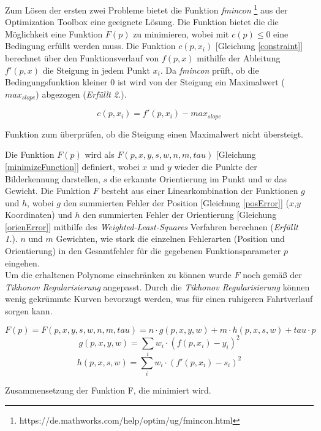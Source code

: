 Zum Lösen der ersten zwei Probleme bietet die \matlab Funktion \textit{fmincon} \footnote{https://de.mathworks.com/help/optim/ug/fmincon.html} aus der Optimization Toolbox eine geeignete Lösung. Die Funktion bietet die die Möglichkeit eine Funktion $F(p)$ zu minimieren, wobei mit $c(p) \leq 0$ eine Bedingung erfüllt werden muss. Die Funktion $c(p,x_i)$ [Gleichung \ref{constraint}] berechnet über den Funktionsverlauf von $f(p,x)$ mithilfe der Ableitung $f'(p,x)$ die Steigung in jedem Punkt $x_i$. Da \textit{fmincon} prüft, ob die Bedingungsfunktion kleiner 0 ist wird von der Steigung ein Maximalwert ($max_{slope}$) abgezogen (\textit{Erfüllt 2.}).\\
\begin{ownequation}[H]
\begin{equation}
c(p,x_i) = f'(p,x_i)-max_{slope}
\end{equation}
\caption{Funktion zum überprüfen, ob die Steigung einen Maximalwert nicht übersteigt.}
\label{constraint}
\end{ownequation}
Die Funktion $F(p)$ wird als $F(p,x,y,s,w,n,m,tau)$ [Gleichung \ref{minimizeFunction}] definiert, wobei $x$ und $y$ wieder die Punkte der Bilderkennung darstellen, $s$ die erkannte Orientierung im Punkt und $w$ das Gewicht. Die Funktion $F$ besteht aus einer Linearkombination der Funktionen $g$ und $h$, wobei $g$ den summierten Fehler der Position [Gleichung \ref{posError}] ($x$,$y$ Koordinaten) und $h$ den summierten Fehler der Orientierung [Gleichung \ref{orienError}] mithilfe des \textit{Weighted-Least-Squares} Verfahren berechnen (\textit{Erfüllt 1.}). $n$ und $m$ Gewichten, wie stark die einzelnen Fehlerarten (Position und Orientierung) in den Gesamtfehler für die gegebenen Funktionsparameter $p$ eingehen.\\
Um die erhaltenen Polynome einschränken zu können wurde $F$ noch gemäß der \textit{Tikhonov Regularisierung} \cite{kaipio2006statistical} angepasst. Durch die \textit{Tikhonov Regularisierung} können wenig gekrümmte Kurven bevorzugt werden, was für einen ruhigeren Fahrtverlauf sorgen kann.
\begin{ownequation}[H]
\begin{equation}
\label{minimizeFunction}
F(p) = F(p,x,y,s,w,n,m,tau) = n \cdot g(p,x,y,w) + m \cdot h(p,x,s,w) + tau \cdot p
\end{equation}
\begin{equation}
\label{posError}
g(p,x,y,w) = \sum_{i} w_i \cdot (f(p,x_i)-y_i)^2
\end{equation}
\begin{equation}
\label{orienError}
h(p,x,s,w) = \sum_{i} w_i \cdot (f'(p,x_i)-s_i)^2
\end{equation}
\caption{Zusammensetzung der Funktion F, die minimiert wird.}
\label{F-function}
\end{ownequation}

